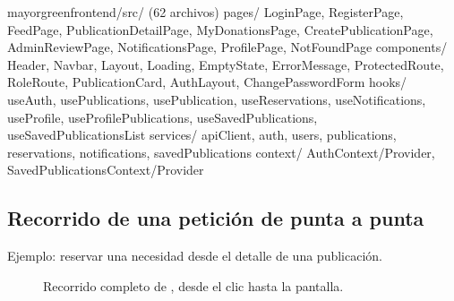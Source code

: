 \documentclass[11pt,letterpaper]{article}
\newcommand{\code}[1]{\texttt{\detokenize{#1}}}
\begin{document}
\begin{codebox}[language=tree,basicstyle=\ttfamily\fontsize{7.2}{8.8}\selectfont]{mayorgreen}{frontend/src/ (62 archivos)}
pages/       LoginPage, RegisterPage, FeedPage, PublicationDetailPage,
             MyDonationsPage, CreatePublicationPage, AdminReviewPage,
             NotificationsPage, ProfilePage, NotFoundPage
components/  Header, Navbar, Layout, Loading, EmptyState, ErrorMessage,
             ProtectedRoute, RoleRoute, PublicationCard, AuthLayout,
             ChangePasswordForm
hooks/       useAuth, usePublications, usePublication, useReservations,
             useNotifications, useProfile, useProfilePublications,
             useSavedPublications, useSavedPublicationsList
services/    apiClient, auth, users, publications, reservations,
             notifications, savedPublications
context/     AuthContext/Provider, SavedPublicationsContext/Provider
\end{codebox}

\subsection{Recorrido de una petición de punta a punta}

Ejemplo: reservar una necesidad desde el detalle de una publicación.

\begin{figure}[H]
\centering
{}
\caption{Recorrido completo de \code{POST /api/v1/reservations}, desde el clic hasta la pantalla.}
\end{figure}
\end{document}
